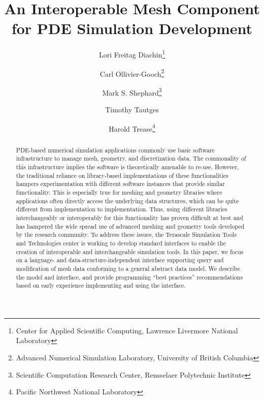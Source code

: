 \documentclass{aiaa-tc}
\begin{document}
\title{An Interoperable Mesh Component for PDE Simulation Development}


\author{Lori Freitag Diachin\thanks{Center for Applied Scientific
  Computing, Lawrence Livermore National Laboratory} \and Carl
  Ollivier-Gooch\thanks{Advanced Numerical Simulation Laboratory,
  University of British Columbia} \and Mark
  S. Shephard\thanks{Scientific Computation Research Center, Rensselaer
  Polytechnic Institute } \and Timothy Tautges \and
  Harold Trease\thanks{Pacific Northwest National Laboratory} }

\maketitle
\begin{abstract}

PDE-based numerical simulation applications commonly use basic software
infrastructure to manage mesh, geometry, and discretization data. The
commonality of this infrastructure implies the software is theoretically
amenable to re-use. However, the traditional reliance on library-based
implementations of these functionalities hampers experimentation with
different software instances that provide similar functionality.  This
is especially true for meshing and geometry libraries where applications
often directly access the underlying data structures, which can be quite
different from implementation to implementation.  Thus, using different
libraries interchangeably or interoperably for this functionality has
proven difficult at best and has hampered the wide spread use of
advanced meshing and geometry tools developed by the research community.
To address these issues, the Terascale Simulation Tools and Technologies
center is working to develop standard interfaces to enable the creation
of interoperable and interchangeable simulation tools. In this paper, we
focus on a language- and data-structure-independent interface supporting
query and modification of mesh data conforming to a general abstract
data model. We describe the model and interface, and provide programming
``best practices'' recommendations based on early experience
implementing and using the interface.

\end{abstract}






\end{document}
